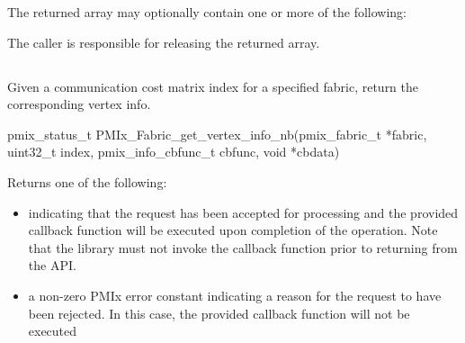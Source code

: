 \reqattrend

The returned array may optionally contain one or more of the following:

\optattrstart
{}
\optattrend

The caller is responsible for releasing the returned array.



\subsection{}

\summary

Given a communication cost matrix index for a specified fabric, return the corresponding vertex info.

\format

\cspecificstart
\begin{codepar}
pmix_status_t
PMIx_Fabric_get_vertex_info_nb(pmix_fabric_t *fabric, uint32_t index,
                               pmix_info_cbfunc_t cbfunc, void *cbdata)
\end{codepar}
\cspecificend

\begin{arglist}
\end{arglist}

Returns one of the following:

\begin{itemize}
\item {} indicating that the request has been accepted for processing and the provided callback function will be executed upon completion of the operation. Note that the library must not invoke the callback function prior to returning from the \ac{API}.
\item a non-zero \ac{PMIx} error constant indicating a reason for the request to have been rejected. In this case, the provided callback function will not be executed
\end{itemize}


